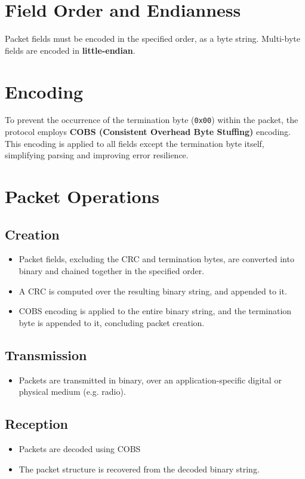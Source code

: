 \documentclass[a4paper,11pt,english]{article}
\begin{document}
\section{Field Order and Endianness}

Packet fields must be encoded in the specified order, as a byte string. Multi-byte fields are encoded in \textbf{little-endian}.

\section{Encoding}

To prevent the occurrence of the termination byte (\texttt{0x00}) within the packet, the protocol employs \textbf{COBS (Consistent Overhead Byte Stuffing)} encoding. This encoding is applied to all fields except the termination byte itself, simplifying parsing and improving error resilience.

\section{Packet Operations}

\subsection{Creation}
\begin{itemize}
  \item Packet fields, excluding the CRC and termination bytes, are converted into binary and chained together in the specified order.
  \item A CRC is computed over the resulting binary string, and appended to it.
  \item COBS encoding is applied to the entire binary string, and the termination byte is appended to it, concluding packet creation.
\end{itemize}

\subsection{Transmission}
\begin{itemize}
  \item Packets are transmitted in binary, over an application-specific digital or physical medium (e.g. radio).
\end{itemize}

\subsection{Reception}
\begin{itemize}
  \item Packets are decoded using COBS
  \item The packet structure is recovered from the decoded binary string.
\end{itemize}
\end{document}
